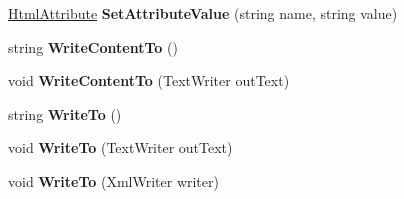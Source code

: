 \begin{DoxyCompactItemize}
\item 
\mbox{\label{class_html_agility_pack_1_1_html_node_af889300d83126b6b6bcf99af3d5c6a89}} 
\hyperlink{class_html_agility_pack_1_1_html_attribute}{Html\+Attribute} {\bfseries Set\+Attribute\+Value} (string name, string value)
\item 
\mbox{\label{class_html_agility_pack_1_1_html_node_a9fa855e558b47c6e03aa278c4b0fa673}} 
string {\bfseries Write\+Content\+To} ()
\item 
\mbox{\label{class_html_agility_pack_1_1_html_node_a7beed28da2479eab4a30b7bac22403ad}} 
void {\bfseries Write\+Content\+To} (Text\+Writer out\+Text)
\item 
\mbox{\label{class_html_agility_pack_1_1_html_node_abd511adf615fcbc8053e2254bcfc3146}} 
string {\bfseries Write\+To} ()
\item 
\mbox{\label{class_html_agility_pack_1_1_html_node_a7b9de14e4a2c3efd00765c64d116ef79}} 
void {\bfseries Write\+To} (Text\+Writer out\+Text)
\item 
\mbox{\label{class_html_agility_pack_1_1_html_node_a0e243f967d0f10e7ba51090d023b8f83}} 
void {\bfseries Write\+To} (Xml\+Writer writer)
\end{DoxyCompactItemize}
